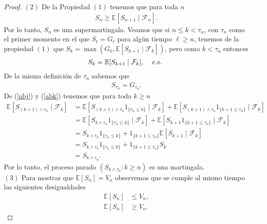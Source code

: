 \begin{proof}
\noindent $(2)$ De la Propiedad $(1)$ tenemos que para toda $n$
	\begin{align*}
	S_n \geq \mathbb{E}[S_{n+1} \mid \mathcal{F}_n].
	\end{align*}
Por lo tanto, $S_n$ es una supermartingala. Veamos que si $n \leq k < \tau_n$, con $\tau_n$ como el primer momento en el que $S_\ell = G_\ell$ para algún tiempo $\ell \geq n$, tenemos de la propiedad $(1)$ que $S_k = \max ( G_k, \mathbb{E} [S_{k+1} \mid \mathcal{F}_k] )$, pero como $k < \tau_n$ entonces
	\begin{align}
	S_k = \mathbb{E}[S_{k+1} \mid \mathcal{F}_k], \hspace{0.3cm} \text{ c.s. } \label{abj}
	\end{align}
De la misma definición de $\tau_n$ sabemos que 
	\begin{align}
	S_{\tau_n} = G_{\tau_n}. \label{abk}
	\end{align}
De (\ref{abj}) y (\ref{abk}) tenemos que para toda $k \geq n$
	\begin{align*}
	\mathbb{E}[S_{(k+1) \wedge \tau_n} \mid \mathcal{F}_k] & = \mathbb{E}[S_{(k+1) \wedge \tau_n} 1_{\{\tau_n \leq k\}} \mid \mathcal{F}_k] + \mathbb{E}[S_{(k+1) \wedge \tau_n} 1_{\{k+1 \leq \tau_n\}} \mid \mathcal{F}_k] \\
	& = \mathbb{E}[S_{k \wedge \tau_n} 1_{\{\tau_n \leq k\}} \mid \mathcal{F}_k] + \mathbb{E}[S_{k+1} 1_{\{k+1 \leq \tau_n\}} \mid \mathcal{F}_k] \\
	& = S_{k \wedge \tau_n} 1_{\{\tau_n \leq k\}} + 1_{\{k+1 \leq \tau_n\}} \mathbb{E}[S_{k+1} \mid \mathcal{F}_k] \\
	& = S_{k \wedge \tau_n} 1_{\{\tau_n \leq k\}} + 1_{\{k+1 \leq \tau_n\}} S_k \\
	& = S_{k \wedge \tau_n}.
	\end{align*}
Por lo tanto, el proceso parado $(S_{k \wedge \tau_n} : k \geq n)$ es una martingala. \\

\noindent $(3)$ Para mostrar que $\mathbb{E}[S_n] = V_n$ observemos que se cumple al mismo tiempo las siguientes desigualdades
\begin{align*}
	\mathbb{E}[S_n] & \leq V_n, \\
    \mathbb{E}[S_n] & \geq V_n.
\end{align*}


\end{proof}
